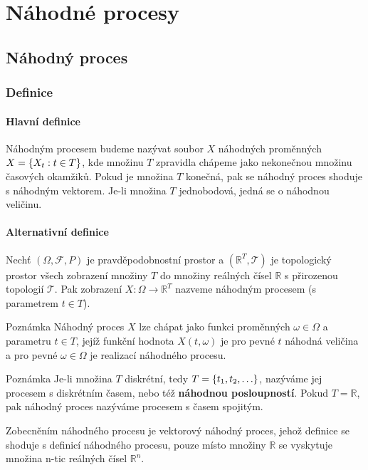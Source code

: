 \chapter{Náhodné procesy}
\section{Náhodný proces}
\subsection{Definice}
\subsubsection{Hlavní definice}
Náhodným procesem budeme nazývat soubor $X$ náhodných proměnných $X=\left\{X_t:t\in T\right\}$, kde množinu $T$ zpravidla chápeme jako nekonečnou množinu časových okamžiků. Pokud je množina $T$ konečná, pak se náhodný proces shoduje s náhodným vektorem. Je-li množina $T$ jednobodová, jedná se o náhodnou veličinu.

\subsubsection{Alternativní definice}
Nechť $(\Omega,\mathscr{F},P)$ je pravděpodobnostní prostor a $(\mathbb{R}^T,\mathscr{T})$ je topologický prostor všech zobrazení množiny $T$ do množiny reálných čísel $\mathbb{R}$ s přirozenou topologií $\mathscr{T}$. Pak zobrazení $X:\Omega\to\mathbb{R}^T$ nazveme náhodným procesem (s parametrem $t\in T$).

\begin{note}{Poznámka}
Náhodný proces $X$ lze chápat jako funkci proměnných $\omega\in\Omega$ a parametru $t\in T$, jejíž funkční hodnota $X(t,\omega)$ je pro pevné $t$ náhodná veličina a pro pevné $\omega\in\Omega$ je realizací náhodného procesu.
\end{note}

\begin{note}{Poznámka}
Je-li množina $T$ diskrétní, tedy $T=\left\{t_1,t_2,\ldots\right\}$, nazýváme jej procesem s diskrétním časem, nebo též \textbf{náhodnou posloupností}. Pokud $T=\mathbb{R}$, pak náhodný proces nazýváme procesem s časem spojitým.
\end{note}

Zobecněním náhodného procesu je vektorový náhodný proces, jehož definice se shoduje s definicí náhodného procesu, pouze místo množiny $\mathbb{R}$ se vyskytuje množina n-tic reálných čísel $\mathbb{R}^n$.

